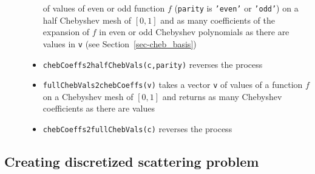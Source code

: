 \begin{description}
\begin{itemize}
          of values of even or odd function $f$ ({\tt parity} is
          {\tt 'even'} or {\tt 'odd'}) on a half Chebyshev mesh of $[0,1]$
          and as many coefficients of the expansion of $f$ in even or odd
          Chebyshev polynomials as there are values in {\tt v} (see
          Section~\ref{sec-cheb_basis})
    \item {\tt chebCoeffs2halfChebVals(c,parity)} reverses the process
    \item {\tt fullChebVals2chebCoeffs(v)} takes a vector {\tt v} of
          values of a function $f$ on a Chebyshev mesh of $[0,1]$ and
          returns as many Chebyshev coefficients as there are values
    \item {\tt chebCoeffs2fullChebVals(c)} reverses the process
   \end{itemize}
\end{description}

\subsection{Creating discretized scattering problem}
\label{sec-scattResComp2d-create}

